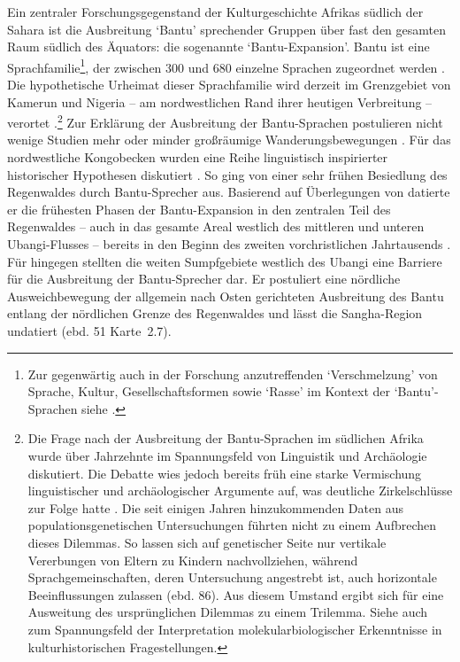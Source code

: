 \begin{multicols}{2}
Ein zentraler Forschungsgegenstand der Kulturgeschichte Afrikas südlich der Sahara ist die Ausbreitung \enquote*{Bantu} sprechender Gruppen über fast den gesamten Raum südlich des Äquators: die sogenannte \enquote*{Bantu-Expansion}. Bantu ist eine Sprachfamilie\footnote{Zur gegenwärtig auch in der Forschung anzutreffenden \enquote*{Verschmelzung} von Sprache, Kultur, Gesellschaftsformen sowie \enquote*{Rasse} im Kontext der \enquote*{Bantu}-Sprachen siehe \textcite[302]{Eggert.2005}.}, der zwischen 300 und 680 einzelne Sprachen zugeordnet werden \parencites{Nurse.2003}[81]{Eggert.2016c}. Die hypothetische Urheimat dieser Sprachfamilie wird derzeit im Grenzgebiet von Kamerun und Nigeria -- am nordwestlichen Rand ihrer heutigen Verbreitung -- verortet \parencites[57, Abb.~2]{Pakendorf.2011}[207 Abb.~6a/b]{Eggert.2012}[630 Abb. 43.2]{deMaret.2013}.\footnote{Die Frage nach der Ausbreitung der Bantu-Sprachen im südlichen Afrika wurde über Jahrzehnte im Spannungsfeld von Linguistik und Archäologie diskutiert. Die Debatte wies jedoch bereits früh eine starke Vermischung linguistischer und archäologischer Argumente auf, was deutliche Zirkelschlüsse zur Folge hatte \parencites{Eggert.1981}{Eggert.2005}[82]{Eggert.2016c}. Die seit einigen Jahren hinzukommenden Daten aus populationsgenetischen Untersuchungen führten nicht zu einem Aufbrechen dieses Dilemmas. So lassen sich auf genetischer Seite nur vertikale Vererbungen von Eltern zu Kindern nachvollziehen, während Sprachgemeinschaften, deren Untersuchung angestrebt ist, auch horizontale Beeinflussungen zulassen (ebd. 86). Aus diesem Umstand ergibt sich für \textcite{Eggert.2016c} eine Ausweitung des ursprünglichen Dilemmas zu einem Trilemma. Siehe auch \textcite{Horsburgh.2015} zum Spannungsfeld der Interpretation molekularbiologischer Erkenntnisse in kulturhistorischen Fragestellungen.\label{ftn:LinguistikTrilemma}} Zur Erklärung der Ausbreitung der Bantu-Sprachen postulieren nicht wenige Studien mehr oder minder großräumige Wanderungsbewegungen \parencites{Vansina.1995}{Ehret.2001}. Für das nordwestliche Kongobecken wurden eine Reihe linguistisch inspirierter historischer Hypothesen diskutiert \parencite[10\,f.]{Eggert.1992}. So ging \textcite{Ehret.1982} von einer sehr frühen Besiedlung des Regenwaldes durch Bantu-Sprecher aus. Basierend auf Überlegungen von \textcite{Heine.1973} datierte er die frühesten Phasen der Bantu-Expansion in den zentralen Teil des Regenwaldes -- auch in das gesamte Areal westlich des mittleren und unteren \mbox{Ubangi}-Flusses -- bereits in den Beginn des zweiten vorchristlichen Jahrtausends \parencite[58, 63~Karte 10]{Ehret.1982}. Für \textcite[51\,f. Karten~2.7--2.8]{Vansina.1990} hingegen stellten die weiten Sumpfgebiete westlich des \mbox{Ubangi} eine Barriere für die Ausbreitung der Bantu-Sprecher dar. Er postuliert eine nördliche Ausweichbewegung der allgemein nach Osten gerichteten Ausbreitung des Bantu entlang der nördlichen Grenze des Regenwaldes und lässt die \mbox{Sangha}-Region undatiert (ebd. 51 Karte~2.7).


\end{multicols}

